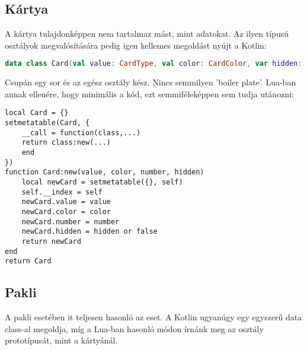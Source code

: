 \subsection{Kártya}
A kártya tulajdonképpen nem tartalmaz mást, mint adatokat. Az ilyen típusú osztályok megvalósítására pedig igen kellemes megoldást nyújt a Kotlin:
\scriptsize
\begin{lstlisting}[language = Kotlin]
data class Card(val value: CardType, val color: CardColor, var hidden: Boolean = false)
\end{lstlisting}
\normalsize
Csupán egy sor és az egész osztály kész. Nincs semmilyen 'boiler plate'. Lua-ban annak ellenére, hogy minimális a kód, ezt semmiféleképpen sem tudja utánozni:
\scriptsize
\begin{lstlisting}[style=Lua]
local Card = {}
setmetatable(Card, {
	__call = function(class,...)
	return class:new(...)
	end
})
function Card:new(value, color, number, hidden)
	local newCard = setmetatable({}, self)
	self.__index = self
	newCard.value = value
	newCard.color = color
	newCard.number = number
	newCard.hidden = hidden or false
	return newCard
end
return Card
\end{lstlisting}
\normalsize
\subsection{Pakli}
A pakli esetében it teljesen hasonló az eset. A Kotlin ugyanúgy egy egyszerű data class-al megoldja, míg a Lua-ban hasonló módon írnánk meg az osztály prototípusát, mint a kártyánál.

